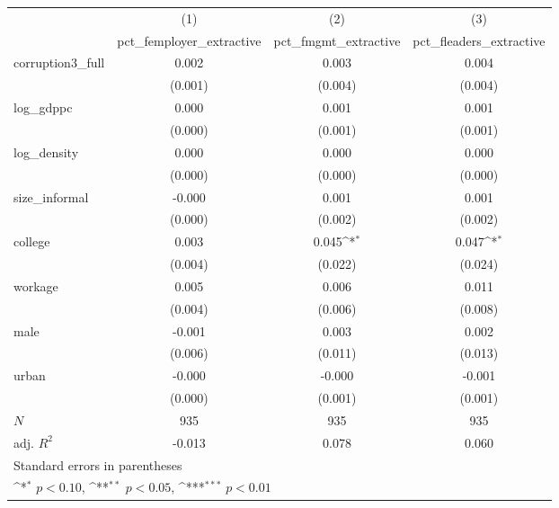 {
\def\sym#1{\ifmmode^{#1}\else\(^{#1}\)\fi}
\begin{tabular}{l*{3}{c}}
\hline\hline
            &\multicolumn{1}{c}{(1)}&\multicolumn{1}{c}{(2)}&\multicolumn{1}{c}{(3)}\\
            &\multicolumn{1}{c}{pct\_femployer\_extractive}&\multicolumn{1}{c}{pct\_fmgmt\_extractive}&\multicolumn{1}{c}{pct\_fleaders\_extractive}\\
\hline
corruption3\_full&       0.002         &       0.003         &       0.004         \\
            &     (0.001)         &     (0.004)         &     (0.004)         \\
[1em]
log\_gdppc   &       0.000         &       0.001         &       0.001         \\
            &     (0.000)         &     (0.001)         &     (0.001)         \\
[1em]
log\_density &       0.000         &       0.000         &       0.000         \\
            &     (0.000)         &     (0.000)         &     (0.000)         \\
[1em]
size\_informal&      -0.000         &       0.001         &       0.001         \\
            &     (0.000)         &     (0.002)         &     (0.002)         \\
[1em]
college     &       0.003         &       0.045\sym{*}  &       0.047\sym{*}  \\
            &     (0.004)         &     (0.022)         &     (0.024)         \\
[1em]
workage     &       0.005         &       0.006         &       0.011         \\
            &     (0.004)         &     (0.006)         &     (0.008)         \\
[1em]
male        &      -0.001         &       0.003         &       0.002         \\
            &     (0.006)         &     (0.011)         &     (0.013)         \\
[1em]
urban       &      -0.000         &      -0.000         &      -0.001         \\
            &     (0.000)         &     (0.001)         &     (0.001)         \\
\hline
\(N\)       &         935         &         935         &         935         \\
adj. \(R^{2}\)&      -0.013         &       0.078         &       0.060         \\
\hline\hline
\multicolumn{4}{l}{\footnotesize Standard errors in parentheses}\\
\multicolumn{4}{l}{\footnotesize \sym{*} \(p<0.10\), \sym{**} \(p<0.05\), \sym{***} \(p<0.01\)}\\
\end{tabular}
}
